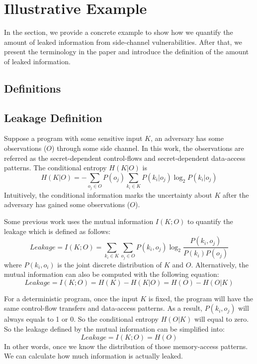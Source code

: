 \section{Illustrative Example}
In the section, we provide a concrete example to show how we 
quantify the amount of leaked information from side-channel
vulnerabilities. After that, we present the terminology in the
paper and introduce the definition of the amount of 
leaked information.
\subsection{Definitions}
\subsection{Leakage Definition}
Suppose a program with some
sensitive input $K$, an adversary has some observations ($O$) through some side channel.
In this work, the observations are referred as the secret-dependent control-flows and
secret-dependent data-access patterns.  The conditional entropy $H(K|O)$ is
\begin{displaymath}
    H(K|O) = - \sum_{o_j {\in} O} {P(o_j) \sum_{k_i {\in} K}{P(k_i|o_j)\log_2P(k_i|o_j)}}
\end{displaymath}
Intuitively, the conditional information marks the uncertainty about $K$ after the adversary
has gained some observations ($O$). 

Some previous work uses the mutual information $I(K; O)$ to quantify the leakage which is defined 
as follows:
\begin{displaymath}
    \mathit{Leakage} = I(K;O) = \sum_{k_i {\in} K}{\sum_{o_j {\in} O}{P(k_i, o_j)\log_2\frac{P(k_i, o_j)}{P(k_i)P(o_j)}}}
\end{displaymath}
where $P(k_i, o_i)$ is the joint discrete distribution of $K$ and $O$.
Alternatively, the mutual information can also be computed with the following equation:
\begin{displaymath}
    \mathit{Leakage} = I(K;O) = H(K) - H(K|O) = H(O) - H(O|K)
\end{displaymath}

For a deterministic program, once the input $K$ is fixed, the program will have the same
control-flow transfers and data-access patterns. As a result, $P(k_i, o_j)$ will always
equals to 1 or 0. So the conditional entropy $H(O|K)$ will equal to zero. So the leakage defined
by the mutual information can be simplified into:
\begin{displaymath}
\label{mutual:information}
    \mathit{Leakage} = I(K;O) = H(O)
\end{displaymath}
In other words, once we know the distribution of those memory-access patterns. We can 
calculate how much information is actually leaked.

